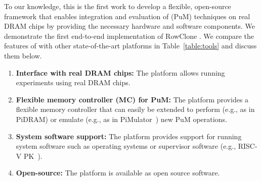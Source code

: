 \label{sec:related-work}

To our knowledge, this is the first work to develop a flexible, open-source framework that enables integration and evaluation of   (PuM) techniques on real DRAM chips by providing the necessary hardware and software components. %
We demonstrate the first end-to-end implementation of RowClone . We compare the features of \X with other state-of-the-art  platforms in Table~\ref{table:tools} and discuss them below.  

\begin{enumerate}
    \item \textbf{Interface with real DRAM chips:} The platform allows running experiments using real DRAM chips.
    \item \textbf{Flexible memory controller (MC) for PuM:} The platform provides a flexible memory controller that can easily be extended to perform (e.g., as in PiDRAM) or emulate (e.g., as in PiMulator~\cite{mosanu2022pimulator}) new PuM operations.
    \item \textbf{System software support:} The platform provides support for running system software such as operating systems or supervisor software (e.g., RISC-V PK~\cite{riscv-pk}).
    \item \textbf{Open-source:} The platform is available as open source software.
\end{enumerate}

